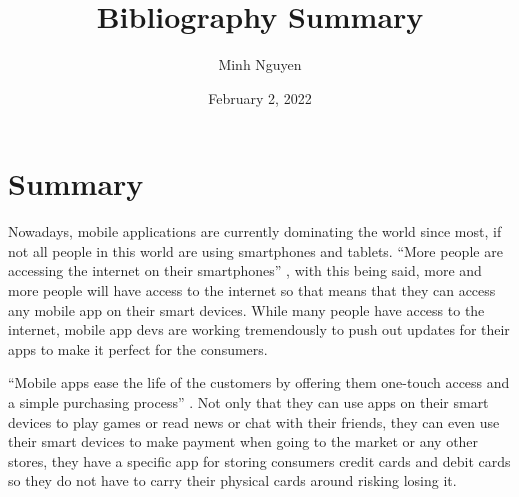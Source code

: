 \documentclass{article}
\title{Bibliography Summary}
\author{Minh Nguyen}
\date{February 2, 2022}
\begin{document}
\maketitle

\section*{Summary}
Nowadays, mobile applications are currently dominating the world since most, if not all people in this world are using smartphones and tablets. “More people are accessing the internet on their smartphones” \cite{samsukha21}, with this being said, more and more people will have access to the internet so that means that they can access any mobile app on their smart devices. While many people have access to the internet, mobile app devs are working tremendously to push out updates for their apps to make it perfect for the consumers.

\medskip

“Mobile apps ease the life of the customers by offering them one-touch access and a simple purchasing process” \cite{hilliard2014}. Not only that they can use apps on their smart devices to play games or read news or chat with their friends, they can even use their smart devices to make payment when going to the market or any other stores, they have a specific app for storing consumers credit cards and debit cards so they do not have to carry their physical cards around risking losing it. 

\printbibliography
\end{document}
